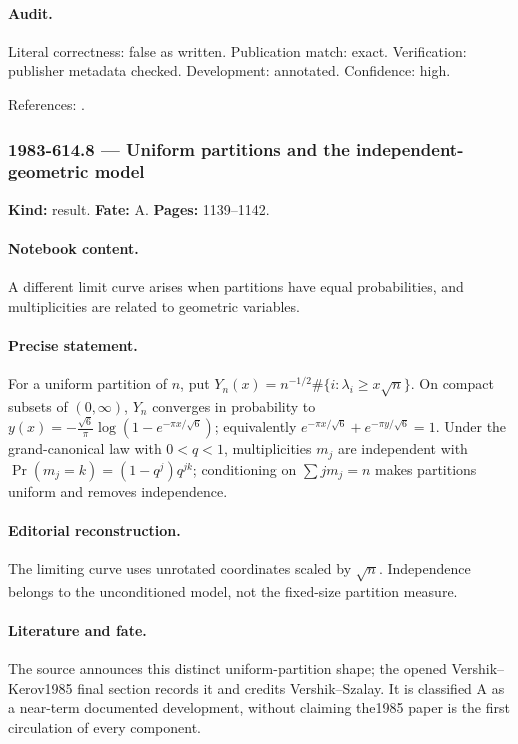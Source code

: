 \paragraph{Audit.} Literal correctness: false as written. Publication match: exact. Verification: publisher metadata checked. Development: annotated. Confidence: high.

\noindent References: \citep{hardyramanujan1918asymptotic}.\par

\subsubsection{1983-614.8 --- Uniform partitions and the independent-geometric model}

\label{item:1983-614.8}

\noindent\textbf{Kind:} result. \textbf{Fate:} A. \textbf{Pages:} 1139--1142.\par

\paragraph{Notebook content.} A different limit curve arises when partitions have equal probabilities, and multiplicities are related to geometric variables.

\paragraph{Precise statement.} For a uniform partition of $n$, put $Y_n(x)=n^{-1/2}\#\{i:\lambda_i\ge x\sqrt n\}$. On compact subsets of $(0,\infty)$, $Y_n$ converges in probability to $y(x)=-\frac{\sqrt6}{\pi}\log(1-e^{-\pi x/\sqrt6})$; equivalently $e^{-\pi x/\sqrt6}+e^{-\pi y/\sqrt6}=1$. Under the grand-canonical law with $0<q<1$, multiplicities $m_j$ are independent with $\Pr(m_j=k)=(1-q^j)q^{jk}$; conditioning on $\sum j m_j=n$ makes partitions uniform and removes independence.

\paragraph{Editorial reconstruction.} The limiting curve uses unrotated coordinates scaled by $\sqrt n$. Independence belongs to the unconditioned model, not the fixed-size partition measure.

\paragraph{Literature and fate.} The source announces this distinct uniform-partition shape; the opened Vershik--Kerov1985 final section records it and credits Vershik--Szalay. It is classified A as a near-term documented development, without claiming the1985 paper is the first circulation of every component.

